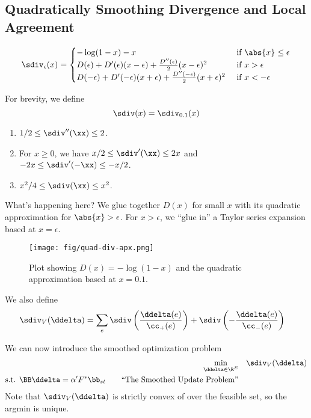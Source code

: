 \subsection{Quadratically Smoothing Divergence and Local Agreement}

\[
  \sdiv_{\epsilon}(x) =
  \begin{cases}
    -\log(1-x) - x & \text{ if } \abs{x} \leq \epsilon \\
    D(\epsilon) + D'(\epsilon) (x - \epsilon) 
    +\frac{D''(\epsilon)}{2} (x - \epsilon)^2
    & \text{ if }  x > \epsilon \\
    D(-\epsilon) + D'(-\epsilon) (x + \epsilon) 
    +\frac{D''(-\epsilon)}{2} (x +\epsilon)^2
    & \text{ if }  x < -\epsilon \\
  \end{cases}
\]

For brevity, we define
\[
  \sdiv(x) =\sdiv_{0.1}(x) 
\]
\begin{lemma}
  \label{lem:sdivderivs}
  \noindent
  \begin{enumerate}
  \item $1/2 \leq \sdiv''(\xx) \leq 2$.
  \item For $x \geq 0$, we have $x/2 \leq \sdiv'(\xx) \leq 2x$
and $-2x \leq \sdiv'(-\xx) \leq -x/2$.
\item $x^2/4 \leq \sdiv(\xx) \leq x^2$.
  \end{enumerate}
\end{lemma}

What's happening here? We glue together $D(x)$ for small $x$ with its
quadratic approximation for $\abs{x} > \epsilon$.
For $x > \epsilon$, we ``glue in'' a Taylor series expansion based at $x =
\epsilon$.

\begin{figure}[H]
  \centering
    \texttt{[image: fig/quad-div-apx.png]} %
    \caption{Plot showing ${D(x) = -\log(1-x)}$ and the quadratic
      approximation based at $x = 0.1$.}
\end{figure}


We also define
  \begin{align*}
  \sdiv_V( \ddelta )
 &=
    \sum_e
     \sdiv\left(\frac{\ddelta(e)}{\cc_+(e)}\right)
    +
     \sdiv\left(-\frac{\ddelta(e)}{\cc_-(e)}\right)
  \end{align*}

We can now introduce the smoothed optimization problem
\begin{align}
   \label{eq:sdivflow}
  \min_{\ddelta \in \R^E} & \quad 
     \sdiv_V( \ddelta )
  \\
  \textrm{s.t. }  \BB\ddelta = \alpha' F^* \bb_{st}
\tag*{``The Smoothed Update Problem''}
\end{align}
Note that  $\sdiv_V( \ddelta )$ is strictly convex of over the
feasible set, so the argmin is unique.

